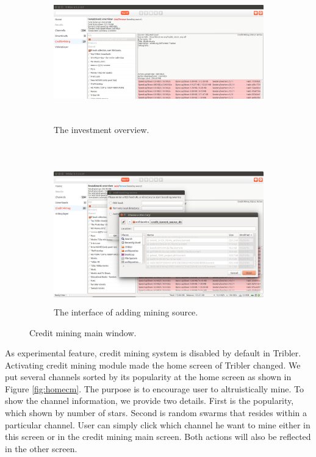 \begin{figure}[h!]
	\begin{adjustwidth}{-2.5cm}{-1cm}
		\begin{subfigure}[t]{0.8\textwidth}
			\centering
			\includegraphics[width=\textwidth, height=6cm]{pics/overview_result.png}
			\caption{The investment overview.}
			\label{fig:overview}
		\end{subfigure}
		~
		\begin{subfigure}[t]{0.6\textwidth}
			\centering
			\includegraphics[width=\textwidth, height=6cm]{pics/add_source.png}
			\caption{The interface of adding mining source.}
			\label{fig:addsource}
		\end{subfigure}
		\caption{Credit mining main window.}
	\end{adjustwidth}
\end{figure}

As experimental feature, credit mining system is disabled by default in Tribler. Activating credit mining module made the home screen of Tribler changed. We put several channels sorted by its popularity at the home screen as shown in Figure \ref{fig:homecm}. The purpose is to encourage user to altruistically mine. To show the channel information, we provide two details. First is the popularity, which shown by number of stars. Second is random swarms that resides within a particular channel. User can simply click which channel he want to mine either in this screen or in the credit mining main screen. Both actions will also be reflected in the other screen. 

